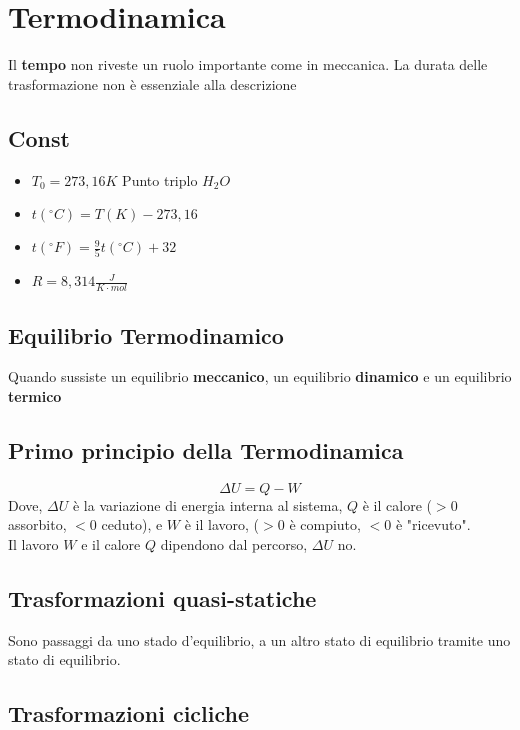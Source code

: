 \documentclass[a4paper]{report}
\begin{document}
  \chapter{Termodinamica}
  Il \textbf{tempo} non riveste un ruolo importante come in meccanica. La durata delle trasformazione non è essenziale alla descrizione

  \section{Const}
  \begin{itemize}
    \item $T_0 = 273,16 K$ Punto triplo $H_2O$
    \item $t(^\circ C)= T(K) - 273,16$
    \item $t(^\circ F)= \frac{9}{5} t(^\circ C) + 32$
    \item $R = 8,314 \frac{J}{K \cdot mol}$
  \end{itemize}

  \section{Equilibrio Termodinamico}
  Quando sussiste un equilibrio \textbf{meccanico}, un equilibrio \textbf{dinamico} e un equilibrio \textbf{termico}

  \section{Primo principio della Termodinamica}
  \[ \Delta U = Q - W \]
  Dove, $\Delta U$ è la variazione di energia interna al sistema, $Q$ è il calore ($>0$ assorbito, $<0$ ceduto), e $W$ è il lavoro, ($>0$ è compiuto, $<0$ è "ricevuto".\\
  Il lavoro $W$ e il calore $Q$ dipendono dal percorso, $\Delta U$ no.

  \section{Trasformazioni quasi-statiche}
  Sono passaggi da uno stado d'equilibrio, a un altro stato di equilibrio tramite uno stato di equilibrio.

  \section{Trasformazioni cicliche}
\end{document}
